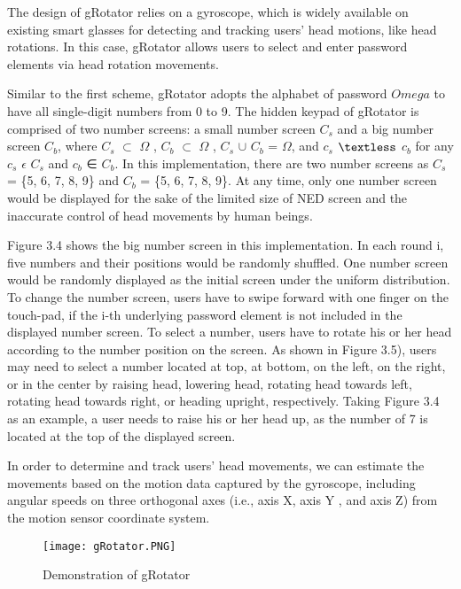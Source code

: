\documentclass[12pt,a4paper,oneside]{report}
\begin{document}
The design of gRotator relies on a gyroscope, which is
widely available on existing smart glasses for detecting and
tracking users’ head motions, like head rotations. In this case,
gRotator allows users to select and enter password elements
via head rotation movements.
\par Similar to the first scheme, gRotator adopts the alphabet
of password $Omega$ to have all single-digit numbers from 0 to 9.
The hidden keypad of gRotator is comprised of two number
screens: a small number screen $C_s$ and a big number screen
$C_b$, where $C_s$ $\subset$  $\Omega$ , $C_b$  $\subset$  $\Omega$ , \newline $C_s$ $\cup$  $C_b$ =  $\Omega$, and $c_s$ $\textless$  $c_b$ for any
$c_s$ $\epsilon$ $C_s$ and $c_b$ ∈ $C_b$. In this implementation, there are two
number screens as $C_s$ = \{5, 6, 7, 8, 9\} and $C_b$ = \{5, 6, 7, 8, 9\}.
At any time, only one number screen would be displayed for
the sake of the limited size of NED screen and the inaccurate
control of head movements by human beings.
\par Figure 3.4 shows the big number screen in this implementation. In each round i, five numbers and their positions
would be randomly shuffled. One number screen would be
randomly displayed as the initial screen under the uniform
distribution. To change the number screen, users have to swipe
forward with one finger on the touch-pad, if the i-th underlying
password element is not included in the displayed number
screen. To select a number, users have to rotate his or her head
according to the number position on the screen. As shown
in Figure 3.5), users may need to select a number located
at top, at bottom, on the left, on the right, or in the center
by raising head, lowering head, rotating head towards left,
rotating head towards right, or heading upright, respectively.
Taking Figure 3.4 as an example, a user needs to raise his or
her head up, as the number of 7 is located at the top of the
displayed screen. 
\par In order to determine and track users’ head movements,
we can estimate the movements based on the motion data
captured by the gyroscope, including angular speeds on three orthogonal axes (i.e., axis X, axis Y , and axis Z) from the
motion sensor coordinate system. 
\begin{figure}[H]
    \begin{center}
        \label{abc}
            \texttt{[image: gRotator.PNG]}
            \caption{Demonstration of gRotator}
    \end{center}
\end{figure}
\end{document}
